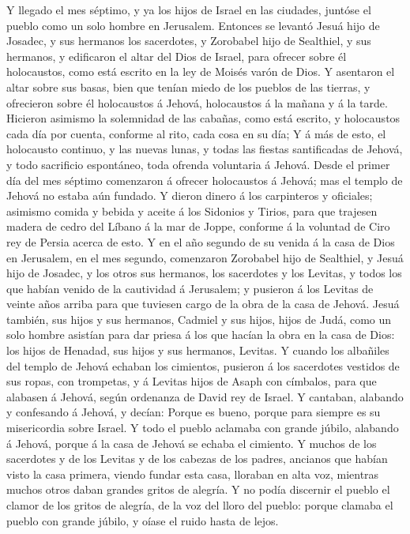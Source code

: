  Y llegado el mes séptimo, y ya los hijos de Israel en las
ciudades, juntóse el pueblo como un solo hombre en Jerusalem.
 Entonces se levantó Jesuá hijo de Josadec, y sus hermanos
los sacerdotes, y Zorobabel hijo de Sealthiel, y sus hermanos, y
edificaron el altar del Dios de Israel, para ofrecer sobre él
holocaustos, como está escrito en la ley de Moisés varón de Dios.
 Y asentaron el altar sobre sus basas, bien que tenían miedo
de los pueblos de las tierras, y ofrecieron sobre él holocaustos á
Jehová, holocaustos á la mañana y á la tarde.  Hicieron
asimismo la solemnidad de las cabañas, como está escrito, y holocaustos
cada día por cuenta, conforme al rito, cada cosa en su día; 
Y á más de esto, el holocausto continuo, y las nuevas lunas, y todas las
fiestas santificadas de Jehová, y todo sacrificio espontáneo, toda
ofrenda voluntaria á Jehová.  Desde el primer día del mes
séptimo comenzaron á ofrecer holocaustos á Jehová; mas el templo de
Jehová no estaba aún fundado.  Y dieron dinero á los
carpinteros y oficiales; asimismo comida y bebida y aceite á los
Sidonios y Tirios, para que trajesen madera de cedro del Líbano á la mar
de Joppe, conforme á la voluntad de Ciro rey de Persia acerca de esto.
 Y en el año segundo de su venida á la casa de Dios en
Jerusalem, en el mes segundo, comenzaron Zorobabel hijo de Sealthiel, y
Jesuá hijo de Josadec, y los otros sus hermanos, los sacerdotes y los
Levitas, y todos los que habían venido de la cautividad á Jerusalem; y
pusieron á los Levitas de veinte años arriba para que tuviesen cargo de
la obra de la casa de Jehová.  Jesuá también, sus hijos y
sus hermanos, Cadmiel y sus hijos, hijos de Judá, como un solo hombre
asistían para dar priesa á los que hacían la obra en la casa de Dios:
los hijos de Henadad, sus hijos y sus hermanos, Levitas.  Y
cuando los albañiles del templo de Jehová echaban los cimientos,
pusieron á los sacerdotes vestidos de sus ropas, con trompetas, y á
Levitas hijos de Asaph con címbalos, para que alabasen á Jehová, según
ordenanza de David rey de Israel.  Y cantaban, alabando y
confesando á Jehová, y decían: Porque es bueno, porque para siempre es
su misericordia sobre Israel. Y todo el pueblo aclamaba con grande
júbilo, alabando á Jehová, porque á la casa de Jehová se echaba el
cimiento.  Y muchos de los sacerdotes y de los Levitas y de
los cabezas de los padres, ancianos que habían visto la casa primera,
viendo fundar esta casa, lloraban en alta voz, mientras muchos otros
daban grandes gritos de alegría.  Y no podía discernir el
pueblo el clamor de los gritos de alegría, de la voz del lloro del
pueblo: porque clamaba el pueblo con grande júbilo, y oíase el ruido
hasta de lejos.

